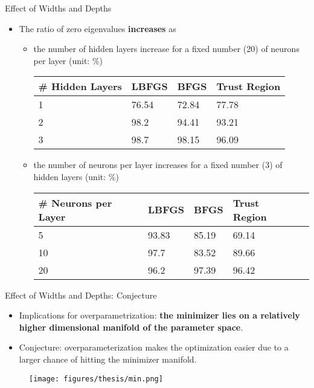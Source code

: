 \documentclass[usenames,dvipsnames]{beamer}
\begin{document}
\begin{frame}{Effect of Widths and Depths}

\begin{itemize}
\item The ratio of zero eigenvalues \textbf{increases} as

\begin{itemize}
\item the number of hidden layers increase for a fixed number (20) of neurons per layer (unit: \%)
\begin{center}
\begin{tabular}{@{}llll@{}}
	\toprule
	\# Hidden   Layers &  LBFGS & BFGS  & Trust Region \\ \midrule
	1                         & 76.54 & 72.84 & 77.78        \\
	2                        & 98.2  & 94.41 & 93.21        \\
	3                         & 98.7  & 98.15 & 96.09        \\ \bottomrule
\end{tabular}
\end{center}

\item the number of neurons per layer increases for a fixed number (3) of hidden layers (unit: \%)
\begin{center}
	\begin{tabular}{@{}lllll@{}}
		\toprule
		\# Neurons per Layer & LBFGS & BFGS  & Trust Region \\ \midrule
		5                         & 93.83 & 85.19 & 69.14        \\
		10                         & 97.7  & 83.52 & 89.66        \\
		20                        & 96.2  & 97.39 & 96.42        \\ \bottomrule
	\end{tabular}
\end{center}
\end{itemize}
\end{itemize}

\end{frame}


\begin{frame}{Effect of Widths and Depths: Conjecture}
\begin{itemize}
\item Implications for overparametrization: \textbf{the minimizer lies on a relatively higher dimensional manifold of the parameter space}.
\item Conjecture: overparameterization makes the optimization easier due to a larger chance of hitting the minimizer manifold.
\end{itemize}

	\begin{figure}[htbp]
	\centering
	\texttt{[image: figures/thesis/min.png]}
\end{figure}
\end{frame}
\end{document}
